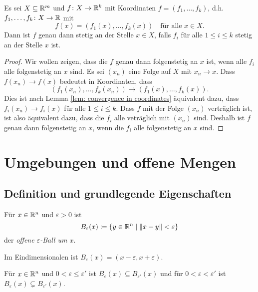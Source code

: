 \documentclass[a4paper,10pt]{article}
\begin{document}
\begin{lem}
 Es sei $X \subseteq \mathbb{R}^m$ und $f \colon X \to \mathbb{R}^k$ mit Koordinaten $f = (f_1, \dotsc, f_k)$, d.h. $f_1, \dotsc, f_k \colon X \to \mathbb{R}$ mit
 \[
  f(x) = (f_1(x), \dotsc, f_k(x)) \quad \text{für alle $x \in X$}.
 \]
 Dann ist $f$ genau dann stetig an der Stelle $x \in X$, falls $f_i$ für alle $1 \leq i \leq k$ stetig an der Stelle $x$ ist.
\end{lem}
\begin{proof}
 Wir wollen zeigen, dass die $f$ genau dann folgenstetig an $x$ ist, wenn alle $f_i$ alle folgenstetig an $x$ sind. Es sei $(x_n)$ eine Folge auf $X$ mit $x_n \to x$. Dass $f(x_n) \to f(x)$ bedeutet in Koordinaten, dass
 \[
  (f_1(x_n), \dotsc, f_k(x_n)) \to (f_1(x), \dots, f_k(x)).
 \]
 Dies ist nach Lemma \ref{lem: convergence in coordinates} äquivalent dazu, dass $f_i(x_n) \to f_i(x)$ für alle $1 \leq i \leq k$. Dass $f$ mit der Folge $(x_n)$ verträglich ist, ist also äquivalent dazu, dass die $f_i$ alle veträglich mit $(x_n)$ sind. Deshalb ist $f$ genau dann folgenstetig an $x$, wenn die $f_i$ alle folgenstetig an $x$ sind.
\end{proof}





\section{Umgebungen und offene Mengen}


\subsection{Definition und grundlegende Eigenschaften}


\begin{defi}
 Für $x \in \mathbb{R}^n$ und $\varepsilon > 0$ ist
 \[
  B_\varepsilon(x) \coloneqq \{y \in \mathbb{R}^n \mid \|x-y\| < \varepsilon\}
 \]
 der \emph{offene $\varepsilon$-Ball um $x$}.
\end{defi}


\begin{bem}
 Im Eindimensionalen ist $B_\varepsilon(x) = (x-\varepsilon,x+\varepsilon)$.
\end{bem}


\begin{bem}
 Für $x \in \mathbb{R}^n$ und $0 < \varepsilon \leq \varepsilon'$ ist $B_\varepsilon(x) \subseteq B_{\varepsilon'}(x)$ und für $0 < \varepsilon < \varepsilon'$ ist $B_\varepsilon(x) \subsetneq B_{\varepsilon'}(x)$.
\end{bem}
\end{document}
